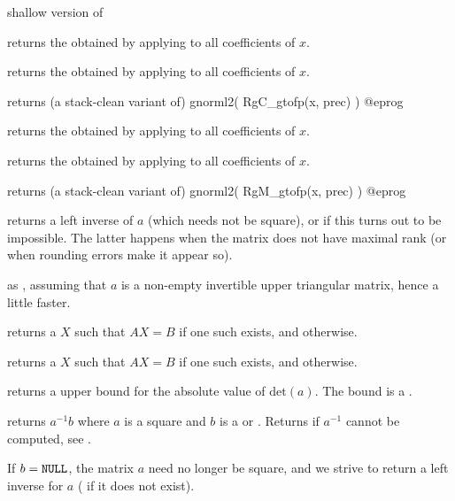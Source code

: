  shallow version of 


 returns the  obtained by
applying  to all coefficients of $x$.

 returns the  obtained by
applying  to all coefficients of $x$.

 returns (a stack-clean variant of)
\bprog
  gnorml2( RgC_gtofp(x, prec) )
@eprog

 returns the  obtained by
applying  to all coefficients of $x$.

 returns the  obtained by
applying  to all coefficients of $x$.

 returns (a stack-clean variant of)
\bprog
  gnorml2( RgM_gtofp(x, prec) )
@eprog


 returns a left inverse of $a$ (which needs not be
square), or  if this turns out to be impossible. The latter
happens when the matrix does not have maximal rank (or when rounding errors
make it appear so).

 as , assuming that $a$ is a
non-empty invertible upper triangular matrix, hence a little faster.

 returns a  $X$ such that
$A X = B$ if one such exists, and  otherwise.

 returns a  $X$ such that
$A X = B$ if one such exists, and  otherwise.

 returns a upper bound for the absolute
value of $\text{det}(a)$. The bound is a .

 returns $a^{-1}b$ where $a$ is a square
 and $b$ is a  or . Returns  if $a^{-1}$
cannot be computed, see .

If $b = {\tt NULL}$, the matrix $a$ need no longer be square, and we strive
to return a left inverse for $a$ ( if it does not exist).

